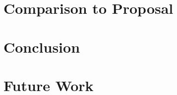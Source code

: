 \documentclass[11pt,letterpaper]{article}
\begin{document}
\section{Comparison to Proposal}


\section{Conclusion}

\section{Future Work}

\printbibliography

% 
% 
% 
% 
\end{document}
